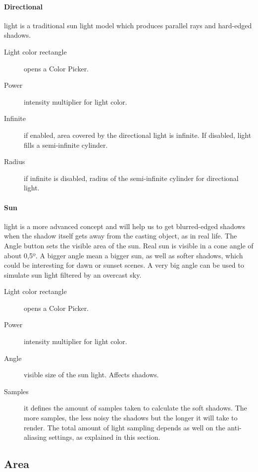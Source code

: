 \smallskip

\paragraph{Directional} light is a traditional sun light model which produces parallel rays and hard-edged shadows.
\begin{description}
\item[Light color rectangle] opens a Color Picker.
\item[Power] intensity multiplier for light color.
\item[Infinite] if enabled, area covered by the directional light is infinite. If disabled, light fills a semi-infinite cylinder.
\item[Radius] if infinite is disabled, radius of the semi-infinite cylinder for directional light.
\end{description}

\paragraph{Sun} light is a more advanced concept and will help us to get blurred-edged shadows when the shadow itself gets away from the casting object, as in real life. The Angle button sets the visible area of the sun. Real sun is visible in a cone angle of about 0,5º. A bigger angle mean a bigger sun, as well as softer shadows, which could be interesting for dawn or sunset scenes. A very big angle can be used to simulate sun light filtered by an overcast sky.
\begin{description}
\item[Light color rectangle] opens a Color Picker.
\item[Power] intensity multiplier for light color.
\item[Angle] visible size of the sun light. Affects shadows.
\item[Samples] it defines the amount of samples taken to calculate the soft shadows. The more samples, the less noisy the shadows but the longer it will take to render. The total amount of light sampling depends as well on the anti-aliasing settings, as explained in this section.
\end{description}



\subsection{Area}

